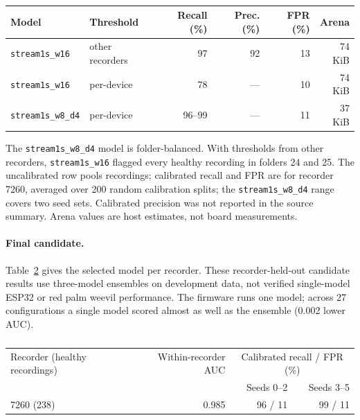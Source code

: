 \begin{table}[htbp]
\centering
\color{black}
\caption[]{}
\label{tab:ml_best}
\footnotesize
\setlength{\tabcolsep}{4pt}
\begin{tabular}{llrrrr}
\toprule
Model & Threshold & Recall (\%) & Prec. (\%) & FPR (\%) & Arena \\
\midrule
\texttt{stream1s\_w16} & other recorders & 97 & 92 & 13 & 74 KiB \\
\texttt{stream1s\_w16} & per-device & 78 & --- & 10 & 74 KiB \\
\texttt{stream1s\_w8\_d4} & per-device & 96--99 & --- & 11 & 37 KiB \\
\bottomrule
\end{tabular}

\smallskip
\parbox{0.9\linewidth}{\footnotesize The \texttt{stream1s\_w8\_d4} model is folder-balanced. With thresholds from other recorders, \texttt{stream1s\_w16} flagged every healthy recording in folders 24 and 25. The uncalibrated row pools recordings; calibrated recall and FPR are for recorder 7260, averaged over 200 random calibration splits; the \texttt{stream1s\_w8\_d4} range covers two seed sets. Calibrated precision was not reported in the source summary. Arena values are host estimates, not board measurements.}
\end{table}

\paragraph{Final candidate.} Table~\ref{tab:ml_final} gives the selected model per recorder. These recorder-held-out candidate results use three-model ensembles on development data, not verified single-model ESP32 or red palm weevil performance. The firmware runs one model; across 27 configurations a single model scored almost as well as the ensemble (0.002 lower AUC).

\begin{table}[htbp]
\centering
\color{black}
\small
\caption{}
\label{tab:ml_final}
\begin{tabular}{lrrr}
\toprule
Recorder (healthy recordings) & Within-recorder AUC & \multicolumn{2}{c}{Calibrated recall / FPR (\%)} \\
 & & Seeds 0--2 & Seeds 3--5 \\
\midrule
7260 (238) & 0.985 & 96 / 11 & 99 / 11 \\
\bottomrule
\end{tabular}
\end{table}

